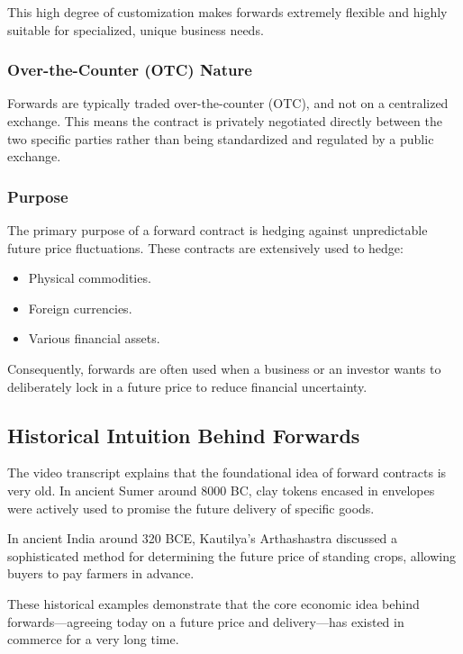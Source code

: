 \documentclass[12pt,openany]{book}
\begin{document}
This high degree of customization makes forwards extremely flexible and highly suitable for specialized, unique business needs.

\subsubsection{Over-the-Counter (OTC) Nature}

Forwards are typically traded over-the-counter (OTC), and not on a centralized exchange. This means the contract is privately negotiated directly between the two specific parties rather than being standardized and regulated by a public exchange.

\subsubsection{Purpose}

The primary purpose of a forward contract is hedging against unpredictable future price fluctuations. These contracts are extensively used to hedge:

\begin{itemize}[leftmargin=*]
    \item Physical commodities.
    \item Foreign currencies.
    \item Various financial assets.
\end{itemize}

Consequently, forwards are often used when a business or an investor wants to deliberately lock in a future price to reduce financial uncertainty.

\subsection{Historical Intuition Behind Forwards}

The video transcript explains that the foundational idea of forward contracts is very old. In ancient Sumer around 8000 BC, clay tokens encased in envelopes were actively used to promise the future delivery of specific goods.

In ancient India around 320 BCE, Kautilya's Arthashastra discussed a sophisticated method for determining the future price of standing crops, allowing buyers to pay farmers in advance.

These historical examples demonstrate that the core economic idea behind forwards---agreeing today on a future price and delivery---has existed in commerce for a very long time.
\end{document}
